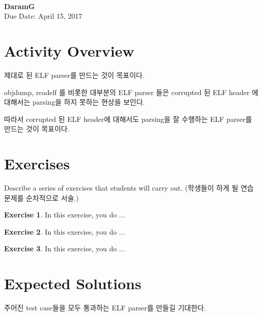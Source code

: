 \documentclass[a4paper, 11pt]{article}
\theoremstyle{definition}
\newtheorem{exercise}{Exercise}
\begin{document}
 \\
         {\phantom{} \hfill \textbf{DaramG}} \\
         {\phantom{} \hfill Due Date: April 15, 2017} \\

\section{Activity Overview}

제대로 된 ELF parser를 만드는 것이 목표이다.

objdump, readelf 를 비롯한 대부분의 ELF parser 들은 corrupted 된 ELF header 에 대해서는 parsing을 하지 못하는 현상을 보인다.

따라서 corrupted 된 ELF header에 대해서도 parsing을 잘 수행하는 ELF parser를 만드는 것이 목표이다.

\section{Exercises}

Describe a series of exercises that students will carry out. (학생들이 하게
될 연습문제를 순차적으로 서술.)

\begin{exercise}

  In this exercise, you do ...

\end{exercise}

\begin{exercise}

  In this exercise, you do ...

\end{exercise}

\begin{exercise}

  In this exercise, you do ...

\end{exercise}

\section{Expected Solutions}

주어진 test case들을 모두 통과하는 ELF parser를 만들길 기대한다.




\end{document}
